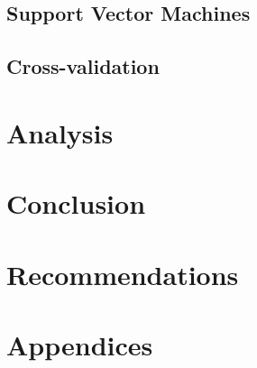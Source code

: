 \documentclass[10pt,a4paper]{article}
\begin{document}
\subsection{Support Vector Machines}

\subsection{Cross-validation}

\section{Analysis}

\section{Conclusion}

\section{Recommendations}



\section{Appendices}
\end{document}
